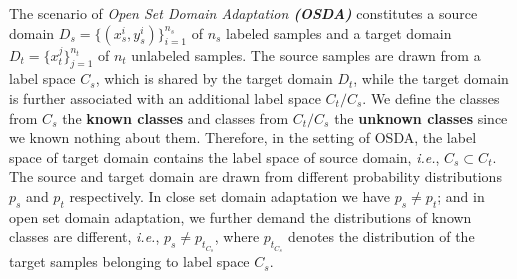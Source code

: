 The scenario of \textit{Open Set Domain Adaptation \textbf{(OSDA)}} constitutes a source domain ${D}_{s}=\{(x^i_s, y^i_s)\}_{i=1}^{n_s}$ of $n_s$ labeled samples and a target domain ${D}_{t}=\{x^j_t\}_{j=1}^{n_t}$ of ${n_t}$ unlabeled samples. 
The source samples are drawn from a label space $C_s$, which is shared by the target domain ${D}_t$, while the target domain is further associated with an additional label space $C_t/C_s$.
We define the classes from $C_s$ the \textbf{known classes} and classes from $C_t/C_s$ the \textbf{unknown classes} since we known nothing about them. 
Therefore, in the setting of OSDA, the label space of target domain contains the label space of source domain, \textit{i.e.}, $C_s \subset C_t$. 
The source and target domain are drawn from different probability distributions $p_s$ and $p_t$ respectively. 
In close set domain adaptation we have $p_s \neq p_t$; and in open set domain adaptation, we further demand the distributions of known classes are different, \textit{i.e.}, $p_s \neq p_{t_{C_s}}$, where $p_{t_{C_s}}$ denotes the distribution of the target samples belonging to label space $C_s$. 





